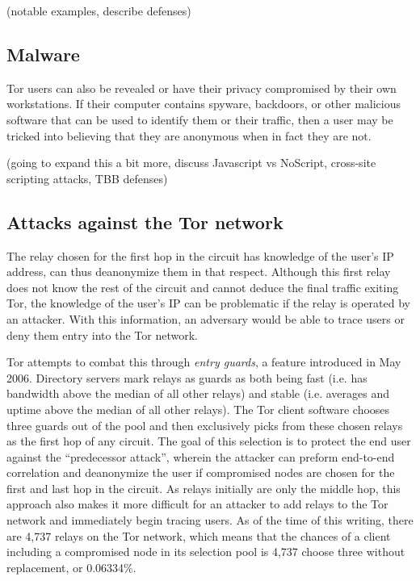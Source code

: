 \documentclass[journal]{IEEEtran}
\begin{document}
(notable examples, describe defenses)

\subsection{Malware}

Tor users can also be revealed or have their privacy compromised by their own workstations. If their computer contains spyware, backdoors, or other malicious software that can be used to identify them or their traffic, then a user may be tricked into believing that they are anonymous when in fact they are not.

(going to expand this a bit more, discuss Javascript vs NoScript, cross-site scripting attacks, TBB defenses)

\subsection{Attacks against the Tor network}


The relay chosen for the first hop in the circuit has knowledge of the user's IP address, can thus deanonymize them in that respect. Although this first relay does not know the rest of the circuit and cannot deduce the final traffic exiting Tor, the knowledge of the user's IP can be problematic if the relay is operated by an attacker. With this information, an adversary would be able to trace users or deny them entry into the Tor network.

Tor attempts to combat this through \textit{entry guards}, a feature introduced in May 2006. Directory servers mark relays as guards as both being fast (i.e. has bandwidth above the median of all other relays) and stable (i.e. averages and uptime above the median of all other relays). The Tor client software chooses three guards out of the pool and then exclusively picks from these chosen relays as the first hop of any circuit.\cite{Xin2009} The goal of this selection is to protect the end user against the ``predecessor attack'', wherein the attacker can preform end-to-end correlation and deanonymize the user if compromised nodes are chosen for the first and last hop in the circuit.\cite{Wright2004} As relays initially are only the middle hop, this approach also makes it more difficult for an attacker to add relays to the Tor network and immediately begin tracing users. As of the time of this writing, there are 4,737 relays on the Tor network, which means that the chances of a client including a compromised node in its selection pool is 4,737 choose three without replacement, or 0.06334\%.
\end{document}
